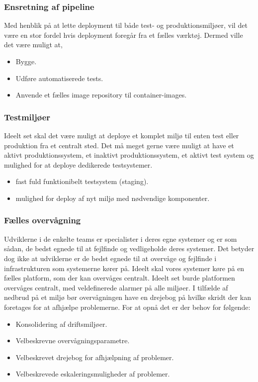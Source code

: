 \documentclass{article}
\begin{document}
\subsubsection{Ensretning af pipeline}
Med henblik på at lette deployment til både test- og produktionsmiljøer, vil det være en stor fordel hvis deployment foregår fra et fælles værktøj.
Dermed ville det være muligt at,

\begin{itemize}
    \item Bygge.
    \item Udføre automatiserede tests.
    \item Anvende et fælles image repository til container-images.
\end{itemize}


\subsubsection{Testmiljøer}
Ideelt set skal det være muligt at deploye et komplet miljø til enten test eller produktion fra et centralt sted. Det må meget gerne være muligt at have et aktivt produktionssystem, et inaktivt produktionssystem, et aktivt test system og mulighed for at deploye dedikerede testsystemer. 

\begin{itemize}
    \item fast fuld funktionibelt testsystem (staging).
    \item mulighed for deploy af nyt miljø med nødvendige komponenter.
\end{itemize}



\subsubsection{Fælles overvågning}
Udviklerne i de enkelte teams er specialister i deres egne systemer og er som sådan, de bedst egnede til at fejlfinde og vedligeholde deres systemer. Det betyder dog ikke at udviklerne er de bedst egnede til at overvåge og fejlfinde i infrastrukturen som systemerne kører på. Ideelt skal vores systemer køre på en fælles platform, som der kan overvåges centralt.
Ideelt set burde platformen overvåges centralt, med veldefinerede alarmer på alle miljøer. I tilfælde af nedbrud på et miljø bør overvågningen have en drejebog på hvilke skridt der kan foretages for at afhjælpe problemerne.
For at opnå det er der behov for følgende:
\begin{itemize}
\item Konsolidering af driftsmiljøer.
\item Velbeskrevne overvågningsparametre.
\item Velbeskrevet drejebog for afhjælpning af problemer.
\item Velbeskrevede eskaleringsmuligheder af problemer.
\end{itemize}
\end{document}
